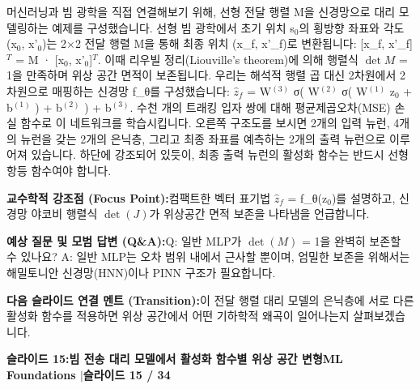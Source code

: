 \documentclass[11pt,a4paper]{article}
\begin{document}
\begin{tcolorbox}[colback=white,colframe=primaryblue,title={\footnotesize\bfseries\color{white}발표자 구두 대본 (Spoken Script)},fontupper=\small,left=6pt,right=6pt,top=3pt,bottom=3pt,boxrule=0.8pt,arc=2.5pt]
머신러닝과 빔 광학을 직접 연결해보기 위해, 선형 전달 행렬 M을 신경망으로 대리 모델링하는 예제를 구성했습니다. 선형 빔 광학에서 초기 위치 s$_0$의 횡방향 좌표와 각도 (x$_0$, x'$_0$)는 2×2 전달 행렬 M을 통해 최종 위치 (x\_f, x'\_f)로 변환됩니다: [x\_f, x'\_f]$^T$ = M · [x$_0$, x'$_0$]$^T$. 이때 리우빌 정리(Liouville's theorem)에 의해 행렬식 $\det M$ = 1을 만족하며 위상 공간 면적이 보존됩니다. 우리는 해석적 행렬 곱 대신 2차원에서 2차원으로 매핑하는 신경망 f\_θ를 구성했습니다: $\hat{z}_f$ = W$^{(3)}$ σ( W$^{(2)}$ σ( W$^{(1)}$ z$_0$ + b$^{(1)}$ ) + b$^{(2)}$ ) + b$^{(3)}$. 수천 개의 트래킹 입자 쌍에 대해 평균제곱오차(MSE) 손실 함수로 이 네트워크를 학습시킵니다. 오른쪽 구조도를 보시면 2개의 입력 뉴런, 4개의 뉴런을 갖는 2개의 은닉층, 그리고 최종 좌표를 예측하는 2개의 출력 뉴런으로 이루어져 있습니다. 하단에 강조되어 있듯이, 최종 출력 뉴런의 활성화 함수는 반드시 선형 항등 함수여야 합니다.
\end{tcolorbox}
\vspace{0.2em}
\begin{tcolorbox}[colback=lightbg,colframe=bordergray,left=6pt,right=6pt,top=3pt,bottom=3pt,boxrule=0.6pt,arc=2.5pt]
\small
\noindent\textbf{\color{navy}교수학적 강조점 (Focus Point):}\enspace 컴팩트한 벡터 표기법 $\hat{z}_f$ = f\_θ(z$_0$)를 설명하고, 신경망 야코비 행렬식 $\det(J)$가 위상공간 면적 보존을 나타냄을 언급합니다.\par\vspace{0.3em}
\noindent\textbf{\color{successgreen}예상 질문 및 모범 답변 (Q\&A):}\enspace Q: 일반 MLP가 $\det(M)$ = 1을 완벽히 보존할 수 있나요? A: 일반 MLP는 오차 범위 내에서 근사할 뿐이며, 엄밀한 보존을 위해서는 해밀토니안 신경망(HNN)이나 PINN 구조가 필요합니다.\par\vspace{0.3em}
\noindent\textbf{\color{accent}다음 슬라이드 연결 멘트 (Transition):}\enspace 이 전달 행렬 대리 모델의 은닉층에 서로 다른 활성화 함수를 적용하면 위상 공간에서 어떤 기하학적 왜곡이 일어나는지 살펴보겠습니다.
\end{tcolorbox}
\clearpage
\hypertarget{slide.15}{}
{}
\noindent\begin{tcolorbox}[colback=navy,colframe=navy,left=6pt,right=6pt,top=3pt,bottom=3pt,boxrule=0pt,arc=2pt]
{\large\bfseries\color{white}슬라이드 15:\enspace 빔 전송 대리 모델에서 활성화 함수별 위상 공간 변형}\hfill{\footnotesize\bfseries\color{white!85!lightbg}ML Foundations \enspace$|$\enspace 슬라이드 15 / 34}
\end{tcolorbox}
\end{document}
